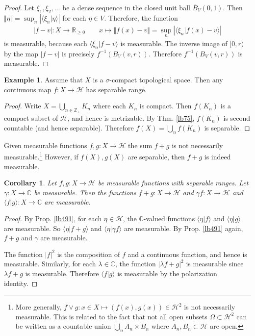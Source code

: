 \documentclass[12pt,b5paper,notitlepage]{article}
\theoremstyle{definition}
\newtheorem{eg}[df]{Example}
\theoremstyle{plain}
\newtheorem{co}[df]{Corollary}
\newcommand{\ovl}{\overline}
\newcommand{\bk}[1]{\langle {#1}\rangle}
\newcommand{\Cbb}{\mathbb C}
\newcommand{\Zbb}{\mathbb Z}
\newcommand{\Rbb}{\mathbb R}
\newcommand{\MH}{\mathcal H}
\numberwithin{equation}{section}
\begin{document}
\begin{subappendices}
\begin{proof}
Let $\xi_1,\xi_2,\dots$ be a dense sequence in the closed unit ball $\ovl B_V(0,1)$. Then $\Vert\eta\Vert=\sup_n|\bk{\xi_n|\eta}|$ for each $\eta\in V$. Therefore, the function
\begin{align*}
|f-v|:X\rightarrow\Rbb_{\geq0}\qquad x\mapsto \Vert f(x)-v\Vert=\sup_n|\bk{\xi_n|f(x)-v}|
\end{align*}
is measurable, because each $\bk{\xi_n|f-v}$ is measurable. The inverse image of $[0,r)$ by the map $|f-v|$ is precisely $f^{-1}(B_V(v,r))$. Therefore $f^{-1}(B_V(v,r))$ is measurable.
\end{proof}

\begin{eg}\label{lb515}
Assume that $X$ is a $\sigma$-compact topological space. Then any continuous map $f:X\rightarrow \MH$ has separable range.
\end{eg}

\begin{proof}
Write $X=\bigcup_{n\in\Zbb_+} K_n$ where each $K_n$ is compact. Then $f(K_n)$ is a compact subset of $\MH$, and hence is metrizable. By Thm. \ref{lb75}, $f(K_n)$ is second countable (and hence separable). Therefore $f(X)=\bigcup_n f(K_n)$ is separable.
\end{proof}



Given measurable functions $f,g:X\rightarrow \MH$ the sum $f+g$ is not necessarily measurable.\footnote{More generally, $f\vee g:x\in X\mapsto (f(x),g(x))\in \MH^2$ is not necessarily measurable. This is related to the fact that not all open subsets $\Omega\subset \MH^2$ can be written as a countable union $\bigcup_n A_n\times B_n$ where $A_n,B_n\subset \MH$ are open.} However, if $f(X),g(X)$ are separable, then $f+g$ is indeed measurable.

\begin{co}\label{lb520}
Let $f,g:X\rightarrow \MH$ be measurable functions with separable ranges. Let $\gamma:X\rightarrow\Cbb$ be measurable. Then the functions $f+g:X\rightarrow\MH$ and $\gamma f:X\rightarrow\MH$ and $\bk{f|g}:X\rightarrow\Cbb$ are measurable.
\end{co}


\begin{proof}
By Prop. \ref{lb491}, for each $\eta\in \MH$, the $\Cbb$-valued functions $\bk{\eta|f}$ and $\bk{\eta|g}$ are measurable. So $\bk{\eta|f+g}$ and $\bk{\eta|\gamma f}$ are measurable. By Prop. \ref{lb491} again, $f+g$ and $\gamma$ are measurable.

The function $|f|^2$ is the composition of $f$ and a continuous function, and hence is measurable. Similarly, for each $\lambda\in\Cbb$, the function $|\lambda f+g|^2$ is measurable since $\lambda f+g$ is measurable. Therefore $\bk{f|g}$ is measurable by the polarization identity. 
\end{proof}



\end{subappendices}
\end{document}

